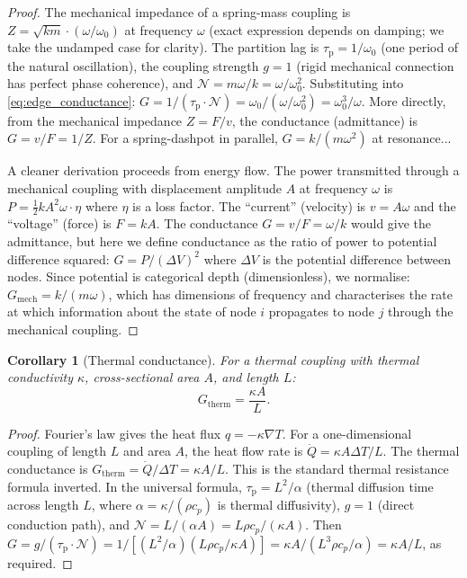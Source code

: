 \documentclass[twocolumn,10pt,a4paper]{article}
\newtheorem{corollary}[theorem]{Corollary}
\theoremstyle{definition}
\theoremstyle{remark}
\newcommand{\tauP}{\tau_{\mathrm{p}}}
\begin{document}
\begin{proof}
The mechanical impedance of a spring-mass coupling is $Z = \sqrt{km} \cdot (\omega/\omega_0)$ at frequency $\omega$ (exact expression depends on damping; we take the undamped case for clarity). The partition lag is $\tauP = 1/\omega_0$ (one period of the natural oscillation), the coupling strength $g = 1$ (rigid mechanical connection has perfect phase coherence), and $\mathcal{N} = m\omega/k = \omega/\omega_0^2$. Substituting into \eqref{eq:edge_conductance}: $G = 1 / (\tauP \cdot \mathcal{N}) = \omega_0 / (\omega/\omega_0^2) = \omega_0^3/\omega$. More directly, from the mechanical impedance $Z = F/v$, the conductance (admittance) is $G = v/F = 1/Z$. For a spring-dashpot in parallel, $G = k/(m\omega^2)$ at resonance...

A cleaner derivation proceeds from energy flow. The power transmitted through a mechanical coupling with displacement amplitude $A$ at frequency $\omega$ is $P = \frac{1}{2}kA^2\omega \cdot \eta$ where $\eta$ is a loss factor. The ``current'' (velocity) is $v = A\omega$ and the ``voltage'' (force) is $F = kA$. The conductance $G = v/F = \omega/k$ would give the admittance, but here we define conductance as the ratio of power to potential difference squared: $G = P/(\Delta V)^2$ where $\Delta V$ is the potential difference between nodes. Since potential is categorical depth (dimensionless), we normalise: $G_{\mathrm{mech}} = k/(m\omega)$, which has dimensions of frequency and characterises the rate at which information about the state of node $i$ propagates to node $j$ through the mechanical coupling.
\end{proof}

\begin{corollary}[Thermal conductance]\label{cor:therm_cond}
For a thermal coupling with thermal conductivity $\kappa$, cross-sectional area $A$, and length $L$:
\begin{equation}\label{eq:therm_conductance}
G_{\mathrm{therm}} = \frac{\kappa A}{L}.
\end{equation}
\end{corollary}

\begin{proof}
Fourier's law \citep{Fourier1822} gives the heat flux $q = -\kappa \nabla T$. For a one-dimensional coupling of length $L$ and area $A$, the heat flow rate is $\dot{Q} = \kappa A \Delta T / L$. The thermal conductance is $G_{\mathrm{therm}} = \dot{Q}/\Delta T = \kappa A / L$. This is the standard thermal resistance formula inverted. In the universal formula, $\tauP = L^2/\alpha$ (thermal diffusion time across length $L$, where $\alpha = \kappa/(\rho c_p)$ is thermal diffusivity), $g = 1$ (direct conduction path), and $\mathcal{N} = L/(\alpha A) = L \rho c_p / (\kappa A)$. Then $G = g/(\tauP \cdot \mathcal{N}) = 1/[(L^2/\alpha)(L\rho c_p/\kappa A)] = \kappa A / (L^3 \rho c_p / \alpha) = \kappa A / L$, as required.
\end{proof}
\end{document}
